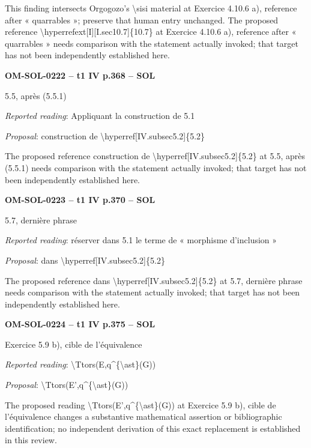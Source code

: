 This finding intersects Orgogozo's \textbackslash{}sisi material at Exercice 4.10.6 a), reference after « quarrables »; preserve that human entry unchanged. The proposed reference \textbackslash{}hyperrefext[I][I.sec10.7]\{10.7\} at Exercice 4.10.6 a), reference after « quarrables » needs comparison with the statement actually invoked; that target has not been independently established here.\par
\par\noindent\textbf{OM-SOL-0222 -- t1 IV p.368 -- SOL}\par
5.5, après (5.5.1)\par
\emph{Reported reading}: Appliquant la construction de 5.1\par
\emph{Proposal}: construction de \textbackslash{}hyperref[IV.subsec5.2]\{5.2\}\par
The proposed reference construction de \textbackslash{}hyperref[IV.subsec5.2]\{5.2\} at 5.5, après (5.5.1) needs comparison with the statement actually invoked; that target has not been independently established here.\par
\par\noindent\textbf{OM-SOL-0223 -- t1 IV p.370 -- SOL}\par
5.7, dernière phrase\par
\emph{Reported reading}: réserver dans 5.1 le terme de « morphisme d'inclusion »\par
\emph{Proposal}: dans \textbackslash{}hyperref[IV.subsec5.2]\{5.2\}\par
The proposed reference dans \textbackslash{}hyperref[IV.subsec5.2]\{5.2\} at 5.7, dernière phrase needs comparison with the statement actually invoked; that target has not been independently established here.\par
\par\noindent\textbf{OM-SOL-0224 -- t1 IV p.375 -- SOL}\par
Exercice 5.9 b), cible de l'équivalence\par
\emph{Reported reading}: \textbackslash{}Ttors(E,q\textasciicircum{}\{\textbackslash{}ast\}(G))\par
\emph{Proposal}: \textbackslash{}Ttors(E',q\textasciicircum{}\{\textbackslash{}ast\}(G))\par
The proposed reading \textbackslash{}Ttors(E',q\textasciicircum{}\{\textbackslash{}ast\}(G)) at Exercice 5.9 b), cible de l'équivalence changes a substantive mathematical assertion or bibliographic identification; no independent derivation of this exact replacement is established in this review.\par
